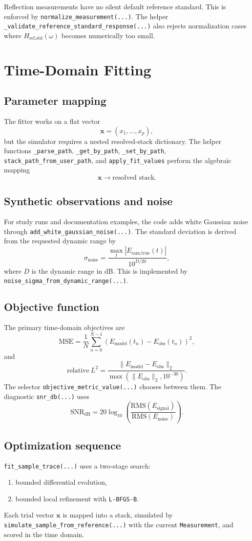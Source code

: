 \documentclass[11pt]{article}
\begin{document}
Reflection measurements have no silent default reference standard. This is enforced by
\texttt{normalize\_measurement(...)}. The helper
\texttt{\_validate\_reference\_standard\_response(...)} also rejects normalization cases where
$H_{\text{ref,std}}(\omega)$ becomes numerically too small.

\section{Time-Domain Fitting}
\subsection{Parameter mapping}
The fitter works on a flat vector
\[
\mathbf{x} = (x_1,\dots,x_p),
\]
but the simulator requires a nested resolved-stack dictionary. The helper functions
\texttt{\_parse\_path}, \texttt{\_get\_by\_path}, \texttt{\_set\_by\_path},
\texttt{stack\_path\_from\_user\_path}, and \texttt{apply\_fit\_values} perform the algebraic
mapping
\[
\mathbf{x} \longrightarrow \text{resolved stack}.
\]

\subsection{Synthetic observations and noise}
For study runs and documentation examples, the code adds white Gaussian noise through
\texttt{add\_white\_gaussian\_noise(...)}. The standard deviation is derived from the requested
dynamic range by
\[
\sigma_{\text{noise}}
=
\frac{\max_t |E_{\text{sam,true}}(t)|}{10^{D/20}},
\]
where $D$ is the dynamic range in dB. This is implemented by
\texttt{noise\_sigma\_from\_dynamic\_range(...)}.

\subsection{Objective function}
The primary time-domain objectives are
\[
\mathrm{MSE}
=
\frac{1}{N}\sum_{n=0}^{N-1}
\left(
E_{\text{model}}(t_n)-E_{\text{obs}}(t_n)
\right)^2,
\]
and
\[
\mathrm{relative}\ L^2
=
\frac{\lVert E_{\text{model}}-E_{\text{obs}}\rVert_2}
{\max(\lVert E_{\text{obs}}\rVert_2,10^{-30})}.
\]
The selector \texttt{objective\_metric\_value(...)} chooses between them. The diagnostic
\texttt{snr\_db(...)} uses
\[
\mathrm{SNR}_{\mathrm{dB}}
=
20 \log_{10}
\left(
\frac{\mathrm{RMS}(E_{\text{signal}})}{\mathrm{RMS}(E_{\text{noise}})}
\right).
\]

\subsection{Optimization sequence}
\texttt{fit\_sample\_trace(...)} uses a two-stage search:
\begin{enumerate}[leftmargin=2em]
\item bounded differential evolution,
\item bounded local refinement with \texttt{L-BFGS-B}.
\end{enumerate}
Each trial vector $\mathbf{x}$ is mapped into a stack, simulated by
\texttt{simulate\_sample\_from\_reference(...)} with the current \texttt{Measurement}, and
scored in the time domain.
\end{document}
